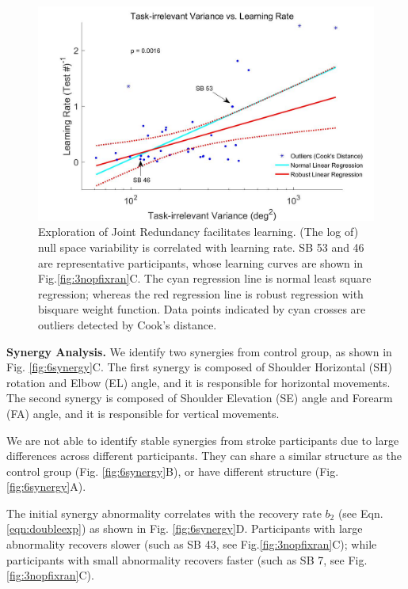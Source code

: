 \begin{figure}
	\centering
	\includegraphics[width=1\linewidth]{figures/5learnRateVSnullVar}
	\caption[Exploration of Joint Redundancy facilitates learning]
	{Exploration of Joint Redundancy facilitates learning. 
		(The log of) null space variability is correlated with learning rate.
		SB 53 and 46 are representative participants, whose learning curves are shown in Fig.\ref{fig:3nopfixran}C.
		The cyan regression line is normal least square regression; whereas the red regression line is robust regression with bisquare weight function. 
		Data points indicated by cyan crosses are outliers detected by Cook's distance.}
	\label{fig:5learnratevsnullvar}
\end{figure}

\textbf{Synergy Analysis.}
We identify two synergies from control group, as shown in Fig. \ref{fig:6synergy}C.
The first synergy is composed of Shoulder Horizontal (SH) rotation and Elbow (EL) angle, and it is responsible for horizontal movements.
The second synergy is composed of Shoulder Elevation (SE) angle and Forearm (FA) angle, and it is responsible for vertical movements.

We are not able to identify stable synergies from stroke participants due to large differences across different participants.
They can share a similar structure as the control group (Fig. \ref{fig:6synergy}B), or have different structure (Fig. \ref{fig:6synergy}A).

The initial synergy abnormality correlates with the recovery rate $ b_2 $ (see Eqn. \ref{eqn:doubleexp}) as shown in Fig. \ref{fig:6synergy}D.
Participants with large abnormality recovers slower (such as SB 43, see Fig.\ref{fig:3nopfixran}C); while participants with small abnormality recovers faster (such as SB 7, see Fig.\ref{fig:3nopfixran}C).




